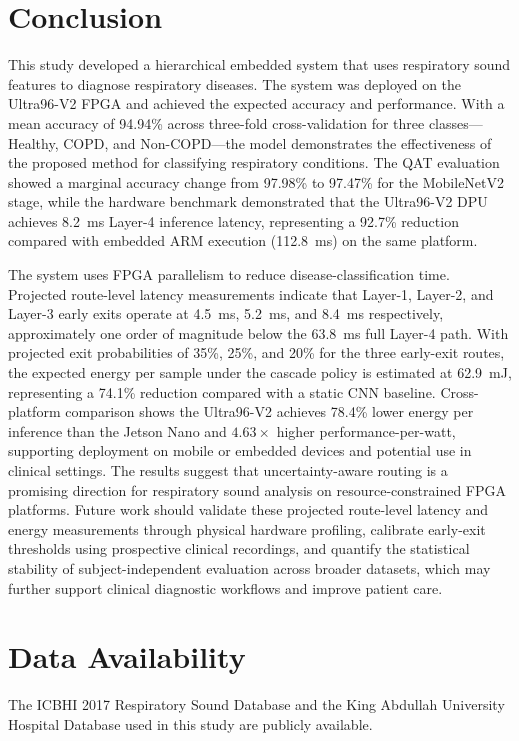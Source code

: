 \section{Conclusion}
\label{sec:conclusion}
This study developed a hierarchical embedded system that uses respiratory sound features to diagnose respiratory diseases. The system was deployed on the Ultra96-V2 FPGA and achieved the expected accuracy and performance. With a mean accuracy of 94.94\% across three-fold cross-validation for three classes---Healthy, COPD, and Non-COPD---the model demonstrates the effectiveness of the proposed method for classifying respiratory conditions. The QAT evaluation showed a marginal accuracy change from 97.98\% to 97.47\% for the MobileNetV2 stage, while the hardware benchmark demonstrated that the Ultra96-V2 DPU achieves 8.2~ms Layer-4 inference latency, representing a 92.7\% reduction compared with embedded ARM execution (112.8~ms) on the same platform.

The system uses FPGA parallelism to reduce disease-classification time. Projected route-level latency measurements indicate that Layer-1, Layer-2, and Layer-3 early exits operate at 4.5~ms, 5.2~ms, and 8.4~ms respectively, approximately one order of magnitude below the 63.8~ms full Layer-4 path. With projected exit probabilities of 35\%, 25\%, and 20\% for the three early-exit routes, the expected energy per sample under the cascade policy is estimated at 62.9~mJ, representing a 74.1\% reduction compared with a static CNN baseline. Cross-platform comparison shows the Ultra96-V2 achieves 78.4\% lower energy per inference than the Jetson Nano and $4.63\times$ higher performance-per-watt, supporting deployment on mobile or embedded devices and potential use in clinical settings. The results suggest that uncertainty-aware routing is a promising direction for respiratory sound analysis on resource-constrained FPGA platforms. Future work should validate these projected route-level latency and energy measurements through physical hardware profiling, calibrate early-exit thresholds using prospective clinical recordings, and quantify the statistical stability of subject-independent evaluation across broader datasets, which may further support clinical diagnostic workflows and improve patient care.

\section*{Data Availability}
The ICBHI 2017 Respiratory Sound Database and the King Abdullah University Hospital Database used in this study are publicly available.
